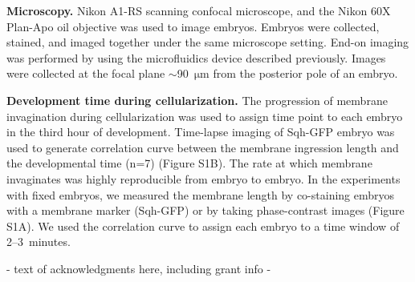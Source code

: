 \documentclass{pnastwo}
\begin{document}
\begin{article}
\begin{materials}
\textbf{Microscopy.}
%
Nikon A1-RS scanning confocal microscope, and the Nikon 60X Plan-Apo oil objective was used to image embryos. Embryos were collected, stained, and imaged together under the same microscope setting. End-on imaging was performed by using the microfluidics device described previously. Images were collected at the focal plane $\sim$90~$\mathrm{\mu m}$ from the posterior pole of an embryo. 

\textbf{Development time during cellularization.} 
%
The progression of membrane invagination during cellularization was used to assign time point to each embryo in the third hour of development. Time-lapse imaging of Sqh-GFP embryo was used to generate correlation curve between the membrane ingression length and the developmental time (n=7) (Figure S1B). The rate at which membrane invaginates was highly reproducible from embryo to embryo. In the experiments with fixed embryos, we measured the membrane length by co-staining embryos with a membrane marker (Sqh-GFP) or by taking phase-contrast images (Figure S1A). We used the correlation curve to assign each embryo to a time window of 2--3~minutes. 

\end{materials}




\begin{acknowledgments}
- text of acknowledgments here, including grant info -
\end{acknowledgments}






\end{article}
\end{document}
